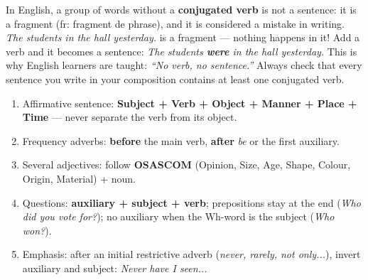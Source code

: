 \documentclass[11pt]{article}
\newcommand{\cle}[1]{{\popxbold\color{popdark}#1}}
\begin{document}
\begin{savaistu}
In English, a group of words without a \textbf{conjugated verb} is not a sentence: it is a \cle{fragment} (fr: fragment de phrase), and it is considered a mistake in writing. \emph{The students in the hall yesterday.} is a fragment --- nothing happens in it! Add a verb and it becomes a sentence: \emph{The students \textbf{were} in the hall yesterday.} This is why English learners are taught: \emph{``No verb, no sentence.''} Always check that every sentence you write in your composition contains at least one conjugated verb.
\end{savaistu}

\begin{aretenir}
\begin{enumerate}
\item Affirmative sentence: \textbf{Subject + Verb + Object + Manner + Place + Time} --- never separate the verb from its object.
\item Frequency adverbs: \textbf{before} the main verb, \textbf{after} \emph{be} or the first auxiliary.
\item Several adjectives: follow \textbf{OSASCOM} (Opinion, Size, Age, Shape, Colour, Origin, Material) + noun.
\item Questions: \textbf{auxiliary + subject + verb}; prepositions stay at the end (\emph{Who did you vote for?}); no auxiliary when the Wh-word is the subject (\emph{Who won?}).
\item Emphasis: after an initial restrictive adverb (\emph{never, rarely, not only...}), invert auxiliary and subject: \emph{Never have I seen...}
\end{enumerate}
\end{aretenir}
\end{document}
